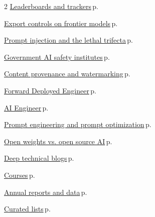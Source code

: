 \documentclass[10pt,a4paper,openany]{report}
\begin{document}
\begin{multicols}{2}
\hyperref[c:evals-9]{Leaderboards and trackers}\,{\color{muted}\scriptsize p.\,\pageref{c:evals-9}}\par\vspace{1pt}
\hyperref[c:safety-2]{Export controls on frontier models}\,{\color{muted}\scriptsize p.\,\pageref{c:safety-2}}\par\vspace{1pt}
\hyperref[c:safety-3]{Prompt injection and the lethal trifecta}\,{\color{muted}\scriptsize p.\,\pageref{c:safety-3}}\par\vspace{1pt}
\hyperref[c:safety-13]{Government AI safety institutes}\,{\color{muted}\scriptsize p.\,\pageref{c:safety-13}}\par\vspace{1pt}
\hyperref[c:safety-14]{Content provenance and watermarking}\,{\color{muted}\scriptsize p.\,\pageref{c:safety-14}}\par\vspace{1pt}
\hyperref[c:practice-0]{Forward Deployed Engineer}\,{\color{muted}\scriptsize p.\,\pageref{c:practice-0}}\par\vspace{1pt}
\hyperref[c:practice-1]{AI Engineer}\,{\color{muted}\scriptsize p.\,\pageref{c:practice-1}}\par\vspace{1pt}
\hyperref[c:practice-3]{Prompt engineering and prompt optimization}\,{\color{muted}\scriptsize p.\,\pageref{c:practice-3}}\par\vspace{1pt}
\hyperref[c:practice-7]{Open weights vs. open source AI}\,{\color{muted}\scriptsize p.\,\pageref{c:practice-7}}\par\vspace{1pt}
\hyperref[c:learn-0]{Deep technical blogs}\,{\color{muted}\scriptsize p.\,\pageref{c:learn-0}}\par\vspace{1pt}
\hyperref[c:learn-1]{Courses}\,{\color{muted}\scriptsize p.\,\pageref{c:learn-1}}\par\vspace{1pt}
\hyperref[c:learn-2]{Annual reports and data}\,{\color{muted}\scriptsize p.\,\pageref{c:learn-2}}\par\vspace{1pt}
\hyperref[c:learn-3]{Curated lists}\,{\color{muted}\scriptsize p.\,\pageref{c:learn-3}}\par\vspace{1pt}
\end{multicols}
\end{document}
